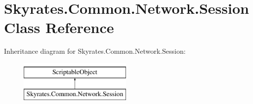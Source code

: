 \hypertarget{class_skyrates_1_1_common_1_1_network_1_1_session}{\section{Skyrates.\-Common.\-Network.\-Session Class Reference}
\label{class_skyrates_1_1_common_1_1_network_1_1_session}
}
Inheritance diagram for Skyrates.\-Common.\-Network.\-Session\-:\begin{figure}[H]
\begin{center}
\leavevmode
\includegraphics[height=2.000000cm]{class_skyrates_1_1_common_1_1_network_1_1_session}
\end{center}
\end{figure}
